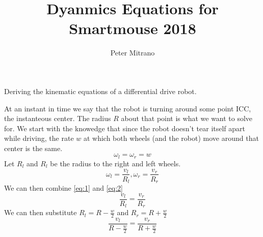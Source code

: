 \documentclass{article}
\begin{document}
\title{Dyanmics Equations for Smartmouse 2018}
\author{Peter Mitrano}

\maketitle

Deriving the kinematic equations of a differential drive robot.

\hfill

\begin{figure}[h]
  \centering
\end{figure}

At an instant in time we say that the robot is turning around some point ICC, the instanteous center. The radius $R$ about that point is what we want to solve for. We start with the knowedge that since the robot doesn't tear itself apart while driving, the rate $w$ at which both wheels (and the robot) move around that center is the same.
\begin{equation} \label{eq:1}
  \omega_l = \omega_r = w
\end{equation}
Let $R_l$ and $R_l$ be the radius to the right and left wheels.
\begin{equation} \label{eq:2}
  \omega_l = \frac{v_l}{R_l}, \omega_r = \frac{v_r}{R_r}
\end{equation}
We can then combine \ref{eq:1} and \ref{eq:2}
\begin{equation}
  \frac{v_l}{R_l} = \frac{v_r}{R_r}
\end{equation}
We can then substitute $R_l = R - \frac{w}{2}$ and $R_r = R + \frac{w}{2}$
\begin{equation}
  \frac{v_l}{R-\frac{w}{2}} = \frac{v_r}{R + \frac{w}{2}}
\end{equation}
\end{document}
